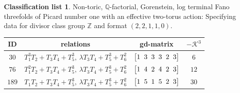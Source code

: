 \documentclass[pdftex]{sigma}%
\theoremstyle{definition}
\newtheorem{class-list}[thm]{Classification list}
\def\ZZ{{\mathbb Z}}
\def\QQ{{\mathbb Q}}
\numberwithin{equation}{section}
\begin{document}
\begin{class-list}
Non-toric, $\QQ$-factorial, Gorenstein, log terminal Fano
threefolds of Picard number one with an effective two-torus action:
Specifying data for divisor class group $\ZZ$ and format $(2,2,1,1,0)$.
\begin{table}[h!]\centering\setlength{\tabcolsep}{3.5pt}
\renewcommand{\arraystretch}{1.25}\small\tabulinesep=1mm
\begin{tabu}{c|c|c|c}
\hline
ID&relations&gd-matrix&$-\mathcal{K}^3$
\\ \hline
${30}$&${T_{1}^{3}T_{2}+T_{3}T_{4}+T_{5}^{3}},\ {\lambda T_{3}T_{4}+T_{5}^{3}+T_{6}^{2}}$
&$\arraycolsep=1mm\begin{bmatrix}{1} & {3} & {3} & {3} & {2} & {3}\end{bmatrix}$&${6}$
\\
\hline
${76}$&${T_{1}^{2}T_{2}+T_{3}T_{4}+T_{5}^{3}},\ {\lambda T_{3}T_{4}+T_{5}^{3}+T_{6}^{2}}$
&$\arraycolsep=1mm\begin{bmatrix}{1} & {4} & {2} & {4} & {2} & {3}\end{bmatrix}$&${12}$
\\ \hline
${189}$&${T_{1}T_{2}+T_{3}T_{4}+T_{5}^{3}},\ {\lambda T_{3}T_{4}+T_{5}^{3}+T_{6}^{2}}$
&$\arraycolsep=1mm\begin{bmatrix}{1} & {5} & {1} & {5} & {2} & {3}\end{bmatrix}$&${30}$
\\ \hline
\end{tabu}%
\end{table}
\end{class-list}
\end{document}

